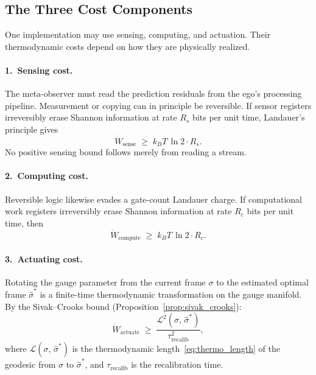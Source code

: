 \documentclass[12pt]{article}
\begin{document}
\subsection{The Three Cost Components}
\label{subsec:cost_components}

One implementation may use sensing, computing, and actuation.  Their
thermodynamic costs depend on how they are physically realized.

\paragraph{1.\ Sensing cost.}
The meta-observer must read the prediction residuals from
the ego's processing pipeline.
Measurement or copying can in principle be reversible.  If sensor
registers irreversibly erase Shannon information at rate $R_s$ bits per unit time,
Landauer's principle gives
\begin{equation}
\label{eq:W_sense}
\dot{W}_{\mathrm{sense}}
\;\geq\; k_BT\,\ln 2 \cdot R_s.
\end{equation}
No positive sensing bound follows merely from reading a stream.

\paragraph{2.\ Computing cost.}
Reversible logic likewise evades a gate-count Landauer charge.  If
computational work registers irreversibly erase Shannon information at rate $R_c$ bits
per unit time, then
\begin{equation}
\label{eq:W_compute}
\dot{W}_{\mathrm{compute}}
\;\geq\; k_BT\,\ln 2 \cdot R_c.
\end{equation}

\paragraph{3.\ Actuating cost.}
Rotating the gauge parameter from the current frame
$\sigma$ to the estimated optimal frame
$\hat{\sigma}^*$ is a finite-time thermodynamic
transformation on the gauge manifold.
By the Sivak--Crooks bound
(Proposition~\ref{prop:sivak_crooks}):
\begin{equation}
\label{eq:W_actuate}
\dot{W}_{\mathrm{actuate}}
\;\geq\; \frac{\mathcal{L}^2(\sigma,\,\hat{\sigma}^*)}
  {\tau_{\mathrm{recalib}}^2},
\end{equation}
where $\mathcal{L}(\sigma,\,\hat{\sigma}^*)$ is the
thermodynamic length~\eqref{eq:thermo_length} of the
geodesic from $\sigma$ to $\hat{\sigma}^*$, and
$\tau_{\mathrm{recalib}}$ is the recalibration time.
\end{document}
